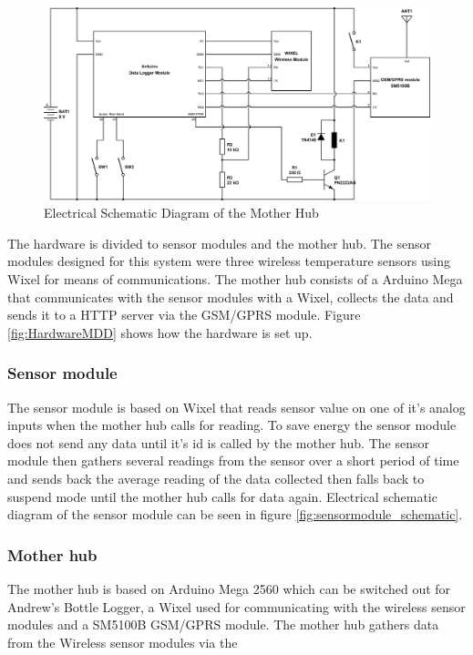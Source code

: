 \begin{figure}
\centering
\includegraphics[width=1\linewidth]{graphics/motherhub_schematic}
\caption{Electrical Schematic Diagram of the Mother Hub\label{fig:motherhub_schematic}}
\end{figure}

The hardware is divided to sensor modules and the mother hub. The sensor modules 
designed for this system were three wireless temperature sensors using Wixel\cite{wixel}
for means of communications. The mother hub consists of a Arduino Mega\cite{arduinoMega}
that communicates with the sensor modules with a Wixel\cite{wixel}, collects the data 
and sends it to a HTTP server via the GSM/GPRS module\cite{SM5100B}. 
Figure \ref{fig:HardwareMDD} shows how the hardware is set up. 

\subsubsection{Sensor module}
The sensor module is based on Wixel\cite{wixel} that reads sensor value on one of it's
analog inputs when the mother hub calls for reading. To save energy the sensor module does
not send any data until it's id is called by the mother hub. The sensor module then 
gathers several readings from the sensor over a short period of time and sends back the 
average reading of the data collected then falls back to suspend mode until the mother 
hub calls for data again. Electrical schematic diagram of the sensor module can
be seen in figure \ref{fig:sensormodule_schematic}.

\subsubsection{Mother hub}
The mother hub is based on Arduino Mega 2560\cite{arduinoMega} which can be switched out 
for Andrew's Bottle Logger\cite{ALog-BottleLogger}, a Wixel\cite{wixel} used for 
communicating with the wireless sensor modules and a SM5100B GSM/GPRS 
module\cite{SM5100B}. The mother hub gathers data from the Wireless sensor modules via 
the  

